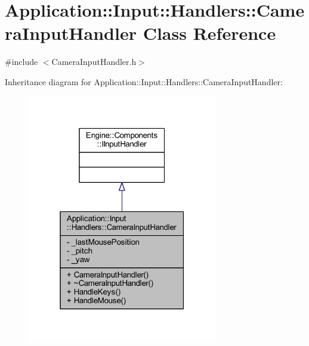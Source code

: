 \hypertarget{classApplication_1_1Input_1_1Handlers_1_1CameraInputHandler}{}\section{Application\+:\+:Input\+:\+:Handlers\+:\+:Camera\+Input\+Handler Class Reference}
\label{classApplication_1_1Input_1_1Handlers_1_1CameraInputHandler}


{\ttfamily \#include $<$Camera\+Input\+Handler.\+h$>$}



Inheritance diagram for Application\+:\+:Input\+:\+:Handlers\+:\+:Camera\+Input\+Handler\+:
\nopagebreak
\begin{figure}[H]
\begin{center}
\leavevmode
\includegraphics[width=235pt]{classApplication_1_1Input_1_1Handlers_1_1CameraInputHandler__inherit__graph}
\end{center}
\end{figure}


